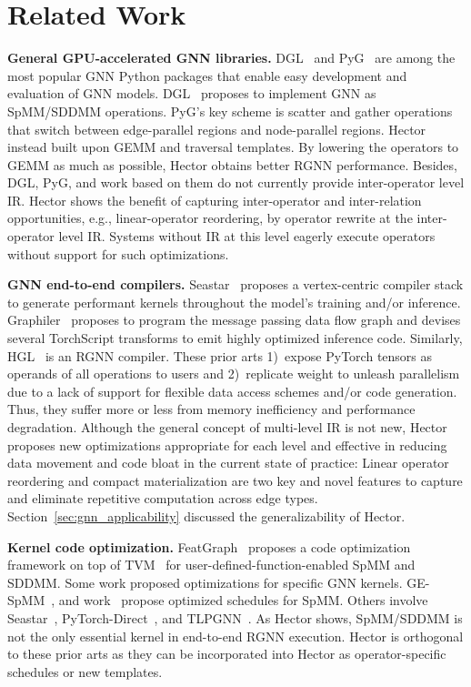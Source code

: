 \section{Related Work}
\label{sec:related_work}


\noindent\textbf{General GPU-accelerated GNN libraries.} DGL~\cite{wang2019deep} and PyG~\cite{fey2019fast} are among the most popular GNN Python packages that enable easy development and evaluation of GNN models.  DGL~\cite{wang2019deep} proposes to implement GNN as SpMM/SDDMM operations. PyG's key scheme is scatter and gather operations that switch between edge-parallel regions and node-parallel regions. Hector instead built upon GEMM and traversal templates. By lowering the operators to GEMM as much as possible, Hector obtains better RGNN performance.
Besides,  DGL, PyG, and work based on them do not currently provide inter-operator level IR. Hector shows the benefit of capturing
inter-operator and inter-relation opportunities, e.g., linear-operator reordering, by operator rewrite at the inter-operator level IR. Systems without IR at this level eagerly execute operators without support for such optimizations.

\noindent
\textbf{GNN end-to-end compilers.} Seastar~\cite{wuSeastarVertexcentricProgramming2021} proposes a vertex-centric compiler stack to generate performant kernels throughout the model's training and/or inference. Graphiler~\cite{xieGraphilerCompilerGraph} proposes to program the message passing data flow graph and devises several TorchScript transforms to emit highly optimized inference code. Similarly, HGL~\cite{guiHGLAcceleratingHeterogeneous} is an RGNN compiler. These prior arts 1)~expose PyTorch tensors as operands of all operations to users and 2)~replicate weight to unleash parallelism due to a lack of support for flexible data access schemes and/or code generation. Thus, they suffer more or less from memory inefficiency and performance degradation.
Although the general concept of multi-level IR is not new, Hector proposes new optimizations appropriate for each level and effective in reducing data movement and code bloat in the current state of practice:
Linear operator reordering and compact materialization are two key and novel features to capture and eliminate repetitive computation across edge types. Section~\ref{sec:gnn_applicability} discussed the generalizability of Hector.

\noindent
\textbf{Kernel code optimization.} FeatGraph~\cite{huFeatGraphFlexibleEfficient2020a} proposes a code optimization framework on top of TVM~\cite{chenTVMAutomatedEndtoEnd2018} for user-defined-function-enabled SpMM and SDDMM. Some work proposed optimizations for specific GNN kernels. GE-SpMM~\cite{huangEfficientSparseMatrix2021, huangGESpMMGeneralPurposeSparse2020}, and work~\cite{hidayetogluAtScaleSparseDeep2020} propose optimized schedules for SpMM. Others involve Seastar~\cite{wuSeastarVertexcentricProgramming2021}, PyTorch-Direct~\cite{minLargeGraphConvolutional2021}, and TLPGNN~\cite{fuTLPGNNLightweightTwoLevel2022}. As Hector shows, SpMM/SDDMM is not the only essential kernel in end-to-end RGNN execution. Hector is orthogonal to these prior arts as they can be incorporated into Hector as operator-specific schedules or new templates.


